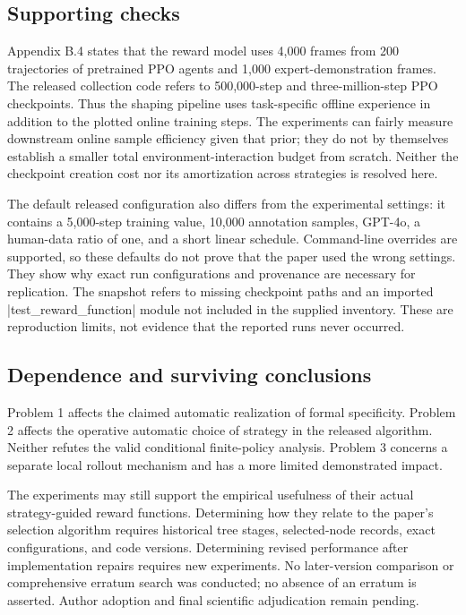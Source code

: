\documentclass[10pt]{article}
\begin{document}
\subsection*{Supporting checks}
Appendix B.4 states that the reward model uses 4,000 frames from 200 trajectories of pretrained PPO agents and 1,000 expert-demonstration frames. The released collection code refers to 500,000-step and three-million-step PPO checkpoints. Thus the shaping pipeline uses task-specific offline experience in addition to the plotted online training steps. The experiments can fairly measure downstream online sample efficiency given that prior; they do not by themselves establish a smaller total environment-interaction budget from scratch. Neither the checkpoint creation cost nor its amortization across strategies is resolved here.\par
The default released configuration also differs from the experimental settings: it contains a 5,000-step training value, 10,000 annotation samples, GPT-4o, a human-data ratio of one, and a short linear schedule. Command-line overrides are supported, so these defaults do not prove that the paper used the wrong settings. They show why exact run configurations and provenance are necessary for replication. The snapshot refers to missing checkpoint paths and an imported |test\_reward\_function| module not included in the supplied inventory. These are reproduction limits, not evidence that the reported runs never occurred.\par
\subsection*{Dependence and surviving conclusions}
Problem 1 affects the claimed automatic realization of formal specificity. Problem 2 affects the operative automatic choice of strategy in the released algorithm. Neither refutes the valid conditional finite-policy analysis. Problem 3 concerns a separate local rollout mechanism and has a more limited demonstrated impact.\par
The experiments may still support the empirical usefulness of their actual strategy-guided reward functions. Determining how they relate to the paper’s selection algorithm requires historical tree stages, selected-node records, exact configurations, and code versions. Determining revised performance after implementation repairs requires new experiments. No later-version comparison or comprehensive erratum search was conducted; no absence of an erratum is asserted. Author adoption and final scientific adjudication remain pending.\par
\end{document}
